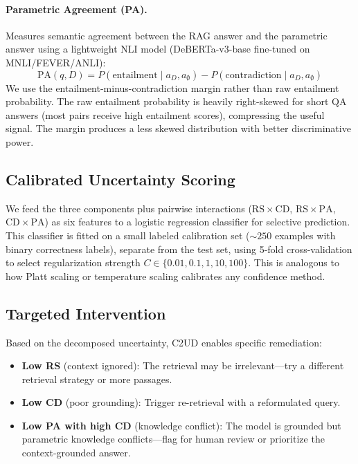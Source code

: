 \documentclass{article}
\newcommand{\ours}{\textsc{C2UD}}
\newcommand{\RS}{\mathrm{RS}}
\newcommand{\CD}{\mathrm{CD}}
\newcommand{\PA}{\mathrm{PA}}
\begin{document}
\paragraph{Parametric Agreement (PA).}
Measures semantic agreement between the RAG answer and the parametric answer using a lightweight NLI model (DeBERTa-v3-base fine-tuned on MNLI/FEVER/ANLI):
\begin{equation}
    \PA(q, D) = P(\text{entailment} \mid a_D, a_\emptyset) - P(\text{contradiction} \mid a_D, a_\emptyset)
\end{equation}
We use the entailment-minus-contradiction margin rather than raw entailment probability.
The raw entailment probability is heavily right-skewed for short QA answers (most pairs receive high entailment scores), compressing the useful signal.
The margin produces a less skewed distribution with better discriminative power.

\subsection{Calibrated Uncertainty Scoring}

We feed the three components plus pairwise interactions ($\RS \times \CD$, $\RS \times \PA$, $\CD \times \PA$) as six features to a logistic regression classifier for selective prediction.
This classifier is fitted on a small labeled calibration set (${\sim}250$ examples with binary correctness labels), separate from the test set, using 5-fold cross-validation to select regularization strength $C \in \{0.01, 0.1, 1, 10, 100\}$.
This is analogous to how Platt scaling or temperature scaling calibrates any confidence method.

\subsection{Targeted Intervention}

Based on the decomposed uncertainty, \ours{} enables specific remediation:
\begin{itemize}
    \item \textbf{Low RS} (context ignored): The retrieval may be irrelevant---try a different retrieval strategy or more passages.
    \item \textbf{Low CD} (poor grounding): Trigger re-retrieval with a reformulated query.
    \item \textbf{Low PA with high CD} (knowledge conflict): The model is grounded but parametric knowledge conflicts---flag for human review or prioritize the context-grounded answer.
\end{itemize}
\end{document}
